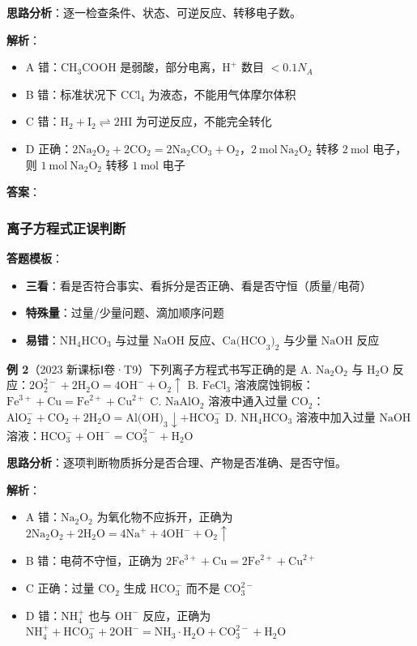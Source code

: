 \textbf{思路分析}：逐一检查条件、状态、可逆反应、转移电子数。

\textbf{解析}：
\begin{itemize}
  \item A 错：$\text{CH}_3\text{COOH}$ 是弱酸，部分电离，$\text{H}^+$ 数目 $< 0.1N_A$
  \item B 错：标准状况下 $\text{CCl}_4$ 为液态，不能用气体摩尔体积
  \item C 错：$\text{H}_2 + \text{I}_2 \rightleftharpoons 2\text{HI}$ 为可逆反应，不能完全转化
  \item D 正确：$2\text{Na}_2\text{O}_2 + 2\text{CO}_2 = 2\text{Na}_2\text{CO}_3 + \text{O}_2$，$2\ \text{mol}\ \text{Na}_2\text{O}_2$ 转移 $2\ \text{mol}$ 电子，则 $1\ \text{mol}\ \text{Na}_2\text{O}_2$ 转移 $1\ \text{mol}$ 电子
\end{itemize}

\textbf{答案}：

\subsubsection{离子方程式正误判断}

\textbf{答题模板}：
\begin{itemize}
  \item \textbf{三看}：看是否符合事实、看拆分是否正确、看是否守恒（质量/电荷）
  \item \textbf{特殊量}：过量/少量问题、滴加顺序问题
  \item \textbf{易错}：$\text{NH}_4\text{HCO}_3$ 与过量 $\text{NaOH}$ 反应、$\text{Ca(HCO}_3)_2$ 与少量 $\text{NaOH}$ 反应
\end{itemize}

\textbf{例 2}（2023 新课标Ⅰ卷·T9）下列离子方程式书写正确的是
A. $\text{Na}_2\text{O}_2$ 与 $\text{H}_2\text{O}$ 反应：$2\text{O}_2^{2-} + 2\text{H}_2\text{O} = 4\text{OH}^- + \text{O}_2\uparrow$
B. $\text{FeCl}_3$ 溶液腐蚀铜板：$\text{Fe}^{3+} + \text{Cu} = \text{Fe}^{2+} + \text{Cu}^{2+}$
C. $\text{NaAlO}_2$ 溶液中通入过量 $\text{CO}_2$：$\text{AlO}_2^- + \text{CO}_2 + 2\text{H}_2\text{O} = \text{Al(OH)}_3\downarrow + \text{HCO}_3^-$
D. $\text{NH}_4\text{HCO}_3$ 溶液中加入过量 $\text{NaOH}$ 溶液：$\text{HCO}_3^- + \text{OH}^- = \text{CO}_3^{2-} + \text{H}_2\text{O}$

\textbf{思路分析}：逐项判断物质拆分是否合理、产物是否准确、是否守恒。

\textbf{解析}：
\begin{itemize}
  \item A 错：$\text{Na}_2\text{O}_2$ 为氧化物不应拆开，正确为 $2\text{Na}_2\text{O}_2 + 2\text{H}_2\text{O} = 4\text{Na}^+ + 4\text{OH}^- + \text{O}_2\uparrow$
  \item B 错：电荷不守恒，正确为 $2\text{Fe}^{3+} + \text{Cu} = 2\text{Fe}^{2+} + \text{Cu}^{2+}$
  \item C 正确：过量 $\text{CO}_2$ 生成 $\text{HCO}_3^-$ 而不是 $\text{CO}_3^{2-}$
  \item D 错：$\text{NH}_4^+$ 也与 $\text{OH}^-$ 反应，正确为 $\text{NH}_4^+ + \text{HCO}_3^- + 2\text{OH}^- = \text{NH}_3\cdot\text{H}_2\text{O} + \text{CO}_3^{2-} + \text{H}_2\text{O}$
\end{itemize}

